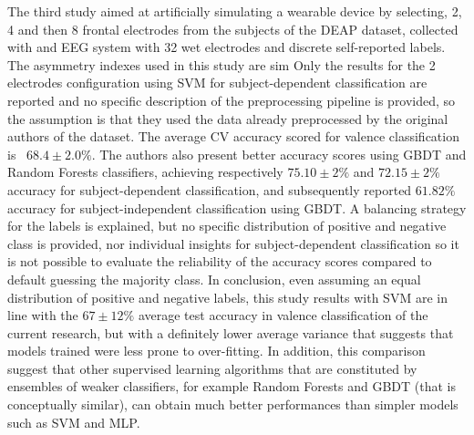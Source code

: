 The third study \cite{wu_estimation_2017} aimed at artificially simulating a wearable device by selecting, 2, 4 and then 8 frontal electrodes from the subjects of the DEAP \cite{koelstra_deap_2012} dataset, collected with and EEG system with 32 wet electrodes and discrete self-reported labels. The asymmetry indexes used in this study are sim Only the results for the 2 electrodes configuration using \ac{SVM} for subject-dependent classification are reported and no specific description of the preprocessing pipeline is provided, so the assumption is that they used the data already preprocessed by the original authors of the dataset. The average \ac{CV} accuracy scored for valence classification is ~\(68.4\pm2.0\%\). The authors also present better accuracy scores using \ac{GBDT} and Random Forests classifiers, achieving respectively \(75.10\pm2\%\) and \(72.15\pm2\%\) accuracy for subject-dependent classification, and subsequently reported \(61.82\% \)accuracy for subject-independent classification using \ac{GBDT}. A balancing strategy for the labels is explained, but no specific distribution of positive and negative class is provided, nor individual insights for subject-dependent classification so it is not possible to evaluate the reliability of the accuracy scores compared to default guessing the majority class. In conclusion, even assuming an equal distribution of positive and negative labels, this study results with \ac{SVM} are in line with the \( 67\pm12\%\) average test accuracy in valence classification of the current research, but with a definitely lower average variance that suggests that models trained were less prone to over-fitting. In addition, this comparison suggest that other supervised learning algorithms that are constituted by ensembles of weaker classifiers, for example Random Forests and \ac{GBDT} (that is conceptually similar), can obtain much better performances than simpler models such as \ac{SVM} and \ac{MLP}.
\\
